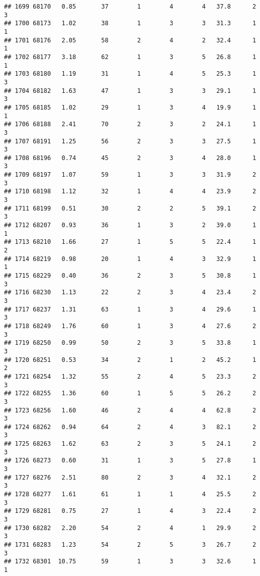 \documentclass[
]{article}
\begin{document}
\begin{verbatim}
## 1699 68170   0.85       37        1        4        4   37.8      2      3
## 1700 68173   1.02       38        1        3        3   31.3      1      1
## 1701 68176   2.05       58        2        4        2   32.4      1      1
## 1702 68177   3.18       62        1        3        5   26.8      1      1
## 1703 68180   1.19       31        1        4        5   25.3      1      3
## 1704 68182   1.63       47        1        3        3   29.1      1      3
## 1705 68185   1.02       29        1        3        4   19.9      1      1
## 1706 68188   2.41       70        2        3        2   24.1      1      3
## 1707 68191   1.25       56        2        3        3   27.5      1      3
## 1708 68196   0.74       45        2        3        4   28.0      1      3
## 1709 68197   1.07       59        1        3        3   31.9      2      3
## 1710 68198   1.12       32        1        4        4   23.9      2      3
## 1711 68199   0.51       30        2        2        5   39.1      2      3
## 1712 68207   0.93       36        1        3        2   39.0      1      1
## 1713 68210   1.66       27        1        5        5   22.4      1      2
## 1714 68219   0.98       20        1        4        3   32.9      1      1
## 1715 68229   0.40       36        2        3        5   30.8      1      3
## 1716 68230   1.13       22        2        3        4   23.4      2      3
## 1717 68237   1.31       63        1        3        4   29.6      1      3
## 1718 68249   1.76       60        1        3        4   27.6      2      3
## 1719 68250   0.99       50        2        3        5   33.8      1      3
## 1720 68251   0.53       34        2        1        2   45.2      1      2
## 1721 68254   1.32       55        2        4        5   23.3      2      3
## 1722 68255   1.36       60        1        5        5   26.2      2      3
## 1723 68256   1.60       46        2        4        4   62.8      2      3
## 1724 68262   0.94       64        2        4        3   82.1      2      3
## 1725 68263   1.62       63        2        3        5   24.1      2      3
## 1726 68273   0.60       31        1        3        5   27.8      1      3
## 1727 68276   2.51       80        2        3        4   32.1      2      3
## 1728 68277   1.61       61        1        1        4   25.5      2      3
## 1729 68281   0.75       27        1        4        3   22.4      2      3
## 1730 68282   2.20       54        2        4        1   29.9      2      3
## 1731 68283   1.23       54        2        5        3   26.7      2      3
## 1732 68301  10.75       59        1        3        3   32.6      1      1

\end{verbatim}
\end{document}
